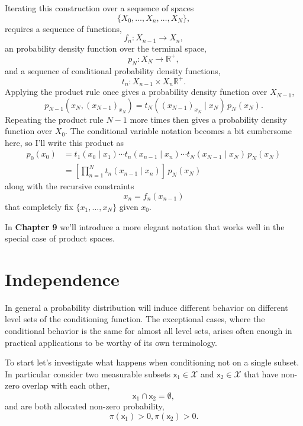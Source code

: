 \documentclass[
  letterpaper,
  DIV=11,
  numbers=noendperiod]{scrartcl}
\begin{document}
Iterating this construction over a sequence of spaces \[
\{ X_{0}, \ldots, X_{n}, \ldots, X_{N} \},
\] requires a sequence of functions, \[
f_{n} : X_{n - 1} \rightarrow X_{n},
\] an probability density function over the terminal space, \[
p_{N} : X_{N} \rightarrow \mathbb{R}^{+},
\] and a sequence of conditional probability density functions, \[
t_{n} : X_{n - 1} \times X_{n} \mathbb{R}^{+}.
\] Applying the product rule once gives a probability density function
over \(X_{N - 1}\), \[
p_{N - 1}(x_{N}, ( x_{N - 1})_{x_{N}} ) =
t_{N}( (x_{N - 1})_{x_{N}} \mid x_{N} ) \,
p_{N} (x_{N} ).
\] Repeating the product rule \(N - 1\) more times then gives a
probability density function over \(X_{0}\). The conditional variable
notation becomes a bit cumbersome here, so I'll write this product as
\begin{align*}
p_{0}(x_{0})
&=
t_{1}( x_{0} \mid x_{1} ) \cdots
t_{n}( x_{n - 1} \mid x_{n} ) \cdots
t_{N}( x_{N - 1} \mid x_{N} ) \, p_{N} (x_{N})
\\
&=
\left[ \prod_{n = 1}^{N} t_{n}( x_{n - 1} \mid x_{n} ) \right] \,
p_{N} (x_{N})
\end{align*} along with the recursive constraints \[
x_{n} = f_{n}( x_{n - 1} )
\] that completely fix \(\{ x_{1}, \ldots, x_{N} \}\) given \(x_{0}\).

In \textbf{Chapter 9} we'll introduce a more elegant notation that works
well in the special case of product spaces.

\section{Independence}\label{independence}

In general a probability distribution will induce different behavior on
different level sets of the conditioning function. The exceptional
cases, where the conditional behavior is the same for almost all level
sets, arises often enough in practical applications to be worthy of its
own terminology.

To start let's investigate what happens when conditioning not on a
single subset. In particular consider two measurable subsets
\(\mathsf{x}_{1} \in \mathcal{X}\) and
\(\mathsf{x}_{2} \in \mathcal{X}\) that have non-zero overlap with each
other, \[
\mathsf{x}_{1} \cap \mathsf{x}_{2} = \emptyset,
\] and are both allocated non-zero probability, \[
\pi(\mathsf{x}_{1}) > 0, \pi(\mathsf{x}_{2}) > 0.
\]
\end{document}
